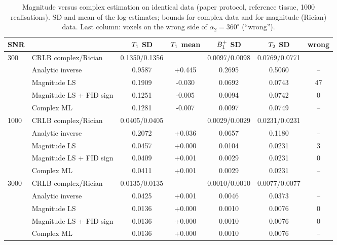 \begin{table}[h]
\centering
\caption{Magnitude versus complex estimation on identical data (paper protocol, reference tissue, 1000 realisations). SD and mean of the log-estimates; bounds for complex data and for magnitude (Rician) data. Last column: voxels on the wrong side of $\alpha_2=360^\circ$ (``wrong'').}
\label{tab:mag}
\footnotesize
\setlength{\tabcolsep}{4pt}
\begin{tabular}{llccccc}
\toprule
SNR & & $T_1$ SD & $T_1$ mean & $B_1^{+}$ SD & $T_2$ SD & wrong\\
\midrule
300 & CRLB complex/Rician & 0.1350/0.1356 & & 0.0097/0.0098 & 0.0769/0.0771 & \\
 & Analytic inverse~\cite{cheng2019} & 0.9587 & +0.445 & 0.2695 & 0.5060 & --\\
 & Magnitude LS & 0.1909 & -0.030 & 0.0692 & 0.0743 & 47\\
 & Magnitude LS + FID sign & 0.1251 & -0.005 & 0.0094 & 0.0742 & 0\\
 & Complex ML & 0.1281 & -0.007 & 0.0097 & 0.0749 & --\\
\midrule
1000 & CRLB complex/Rician & 0.0405/0.0405 & & 0.0029/0.0029 & 0.0231/0.0231 & \\
 & Analytic inverse~\cite{cheng2019} & 0.2072 & +0.036 & 0.0657 & 0.1180 & --\\
 & Magnitude LS & 0.0457 & +0.000 & 0.0104 & 0.0231 & 3\\
 & Magnitude LS + FID sign & 0.0409 & +0.001 & 0.0029 & 0.0231 & 0\\
 & Complex ML & 0.0411 & +0.001 & 0.0029 & 0.0231 & --\\
\midrule
3000 & CRLB complex/Rician & 0.0135/0.0135 & & 0.0010/0.0010 & 0.0077/0.0077 & \\
 & Analytic inverse~\cite{cheng2019} & 0.0425 & +0.001 & 0.0046 & 0.0373 & --\\
 & Magnitude LS & 0.0136 & +0.000 & 0.0010 & 0.0076 & 0\\
 & Magnitude LS + FID sign & 0.0136 & +0.000 & 0.0010 & 0.0076 & 0\\
 & Complex ML & 0.0136 & +0.000 & 0.0010 & 0.0076 & --\\
\bottomrule
\end{tabular}
\end{table}
